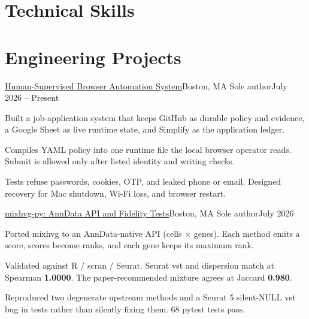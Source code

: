 \section{Technical Skills}
\resumeSubHeadingListStart
\resumeSubHeadingListEnd

\section{Engineering Projects}
\resumeSubHeadingListStart

  \resumeSubheading
    {\href{https://github.com/JunyiZhou-Conny/job-search-2026-2027-starter}{Human-Supervised Browser Automation System}}{Boston, MA}
    {Sole author}{July 2026 -- Present}
    \resumeItemListStart
      \item Built a job-application system that keeps GitHub as durable policy and evidence, a Google Sheet as live runtime state, and Simplify as the application ledger.
      \item Compiles YAML policy into one runtime file the local browser operator reads. Submit is allowed only after listed identity and writing checks.
      \item Tests refuse passwords, cookies, OTP, and leaked phone or email. Designed recovery for Mac shutdown, Wi-Fi loss, and browser restart.
    \resumeItemListEnd

  \resumeSubheading
    {\href{https://github.com/JunyiZhou-Conny/mixhvg-py}{mixhvg-py: AnnData API and Fidelity Tests}}{Boston, MA}
    {Sole author}{July 2026}
    \resumeItemListStart
      \item Ported mixhvg to an AnnData-native API (cells $\times$ genes). Each method emits a score, scores become ranks, and each gene keeps its maximum rank.
      \item Validated against R / scran / Seurat. Seurat vst and dispersion match at Spearman \textbf{1.0000}. The paper-recommended mixture agrees at Jaccard \textbf{0.980}.
      \item Reproduced two degenerate upstream methods and a Seurat 5 silent-NULL vst bug in tests rather than silently fixing them. 68 pytest tests pass.
    \resumeItemListEnd

